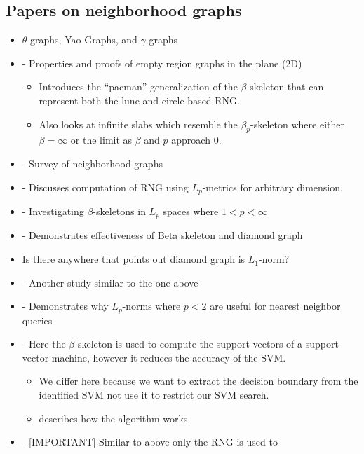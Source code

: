 \documentclass[12pt]{article}
\begin{document}
\subsection{Papers on neighborhood graphs}

\begin{itemize}
	\item $\theta$-graphs, Yao Graphs, and $\gamma$-graphs
	\item \cite{CardinalColletteLangerman2009} - Properties and proofs of empty region
	graphs in the plane (2D)
	\begin{itemize}
		\item Introduces the ``pacman'' generalization of the $\beta$-skeleton
		that can represent both the lune and circle-based RNG.
		\item Also looks at infinite slabs which resemble the $\beta_p$-skeleton
		where either $\beta=\infty$ or the limit as $\beta$ and $p$ approach
		$0$.
	\end{itemize}
	\item \cite{JaromczykToussaint1992} - Survey of neighborhood graphs
	\item \cite{JaromczykKowaluk1987} - Discusses computation of RNG using
	$L_p$-metrics for arbitrary dimension.
	\item \cite{KowalukMajewska2014} - Investigating $\beta$-skeletons in $L_p$ spaces
	where $1 < p < \infty$
	\item \cite{CorreaLindstrom2011} - Demonstrates effectiveness of Beta
	skeleton and diamond graph
	\item Is there anywhere that points out diamond graph is $L_1$-norm?
	\item \cite{MaljovecSahaLindstrom2013} - Another study similar to the one
	above
	\item \cite{AggarwalHinneburgKeim2001} - Demonstrates why $L_p$-norms where
	$p<2$ are useful for nearest neighbor queries
	\item \cite{ZhangKing2002b} - Here the $\beta$-skeleton is used to compute
	the support vectors of a support vector machine, however it reduces the
	accuracy of the SVM.
	\begin{itemize}
		\item We differ here because we want to extract the decision boundary
		from the identified SVM not use it to restrict our SVM search.
		\item \cite{ZhangKing2002a} describes how the algorithm works
	\end{itemize}
	\item \cite{GotoIshidaUchida2015} - [IMPORTANT] Similar to above only the RNG is used to

\end{itemize}
\end{document}
